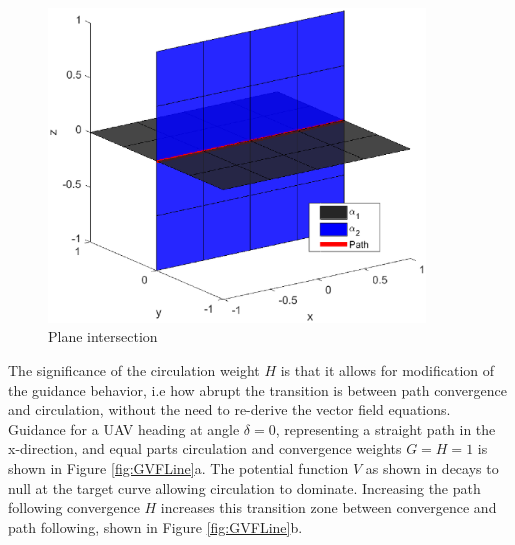 \documentclass[conf]{new-aiaa}
\begin{document}
\begin{figure}[H]
	\centering
	\includegraphics[trim=0 20 0 20,clip,width=10cm]{Figures/newIntersection}
	\caption{Plane intersection}
	\label{fig:planeIntersection}
\end{figure}

The significance of the circulation weight $H$ is that it allows for modification of the guidance behavior, i.e how abrupt the transition is between path convergence and circulation, without the need to re-derive the vector field equations. Guidance for a UAV heading at angle $\delta = 0$, representing a straight path in the x-direction, and equal parts circulation and convergence weights $G=H=1$ is shown in Figure \ref{fig:GVFLine}a. The potential function $V$ as shown in \cite{goncalves_artificial_2009,goncalves_circulation_2010,goncalves_vector_2010} decays to null at the target curve allowing circulation to dominate. Increasing the path following convergence $H$ increases this transition zone between convergence and path following, shown in Figure \ref{fig:GVFLine}b. 
\end{document}
